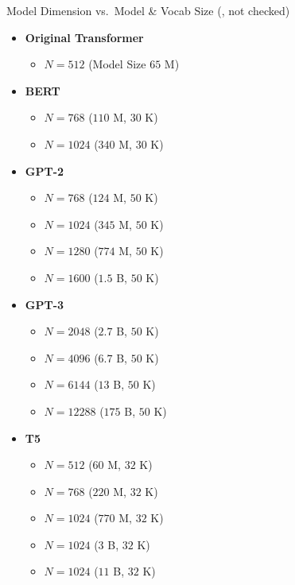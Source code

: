 \begin{slide}[\slideopts,toc={Model Dimension}]{Model Dimension vs.~Model \& Vocab Size
(, not checked)}

\vspace{-2em}


% 

\begin{multicols}{2}
\begin{itemize}
    \item \textbf{Original Transformer}
    \begin{itemize}
      \item $N = 512$ (Model Size $65$ M)
    \end{itemize}

    \item \textbf{BERT}
    \begin{itemize}
        \item $N = 768$ ($110$ M, $30$ K)
        \item $N = 1024$ ($340$ M, $30$ K)
    \end{itemize}

    \item \textbf{GPT-2}
    \begin{itemize}
        \item $N = 768$ ($124$ M, $50$ K)
        \item $N = 1024$ ($345$ M, $50$ K)
        \item $N = 1280$ ($774$ M, $50$ K)
        \item $N = 1600$ ($1.5$ B, $50$ K)
    \end{itemize}

    \item \textbf{GPT-3}
    \begin{itemize}
        \item $N = 2048$ ($2.7$ B, $50$ K)
        \item $N = 4096$ ($6.7$ B, $50$ K)
        \item $N = 6144$ ($13$ B, $50$ K)
        \item $N = 12288$ ($175$ B, $50$ K)
    \end{itemize}

    \item \textbf{T5}
    \begin{itemize}
        \item $N = 512$ ($60$ M, $32$ K)
        \item $N = 768$ ($220$ M, $32$ K)
        \item $N = 1024$ ($770$ M, $32$ K)
        \item $N = 1024$ ($3$ B, $32$ K)
        \item $N = 1024$ ($11$ B, $32$ K)
    \end{itemize}


\end{itemize}
\end{multicols}
\end{slide}

